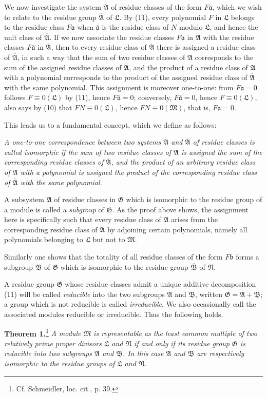 \documentclass[11pt]{article}
\newcommand{\mM}{\mathfrak{M}}
\newcommand{\mN}{\mathfrak{N}}
\newcommand{\mL}{\mathfrak{L}}
\newcommand{\mG}{\mathfrak{G}}
\newcommand{\mA}{\mathfrak{A}}
\newcommand{\mB}{\mathfrak{B}}
\newcommand{\ma}{\mathfrak{a}}
\newcommand{\mb}{\mathfrak{b}}
\newcommand{\mbarA}{\overline{\mathfrak{A}}}
\newcommand{\mbarB}{\overline{\mathfrak{B}}}
\newcommand{\bara}{\overline{\mathfrak{a}}}
\begin{document}
We now investigate the system $\mA$ of residue classes of the form $F\ma$, which we wish to relate to the residue group $\mbarA$ of $\mL$. By (11), every polynomial $F$ in $\mL$ belongs to the residue class $F\ma$ when $\bara$ is the residue class of $N$ modulo $\mL$, and hence the unit class of $\mbarA$. If we now associate the residue classes $F\ma$ in $\mA$ with the residue classes $F\bara$ in $\mbarA$, then to every residue class of $\mA$ there is assigned a residue class of $\mbarA$, in such a way that the sum of two residue classes of $\mA$ corresponds to the sum of the assigned residue classes of $\mbarA$, and the product of a residue class of $\mA$ with a polynomial corresponds to the product of the assigned residue class of $\mbarA$ with the same polynomial. This assignment is moreover one-to-one: from $F\ma=0$ follows $F\equiv0(\mL)$ by (11), hence $F\bara=0$; conversely, $F\bara=0$, hence $F\equiv0(\mL)$, also says by (10) that $FN\equiv0(\mL)$, hence $FN\equiv0(\mM)$, that is, $F\ma=0$.

This leads us to a fundamental concept, which we define as follows:

\emph{A one-to-one correspondence between two systems $\mA$ and $\mbarA$ of residue classes is called isomorphic if the sum of two residue classes of $\mA$ is assigned the sum of the corresponding residue classes of $\mbarA$, and the product of an arbitrary residue class of $\mA$ with a polynomial is assigned the product of the corresponding residue class of $\mbarA$ with the same polynomial.}

A subsystem $\mA$ of residue classes in $\mG$ which is isomorphic to the residue group of a module is called a \emph{subgroup} of $\mG$. As the proof above shows, the assignment here is specifically such that every residue class of $\mA$ arises from the corresponding residue class of $\mbarA$ by adjoining certain polynomials, namely all polynomials belonging to $\mL$ but not to $\mM$.

Similarly one shows that the totality of all residue classes of the form $F\mb$ forms a subgroup $\mB$ of $\mG$ which is isomorphic to the residue group $\mbarB$ of $\mN$.

A residue group $\mG$ whose residue classes admit a unique additive decomposition (11) will be called \emph{reducible} into the two subgroups $\mA$ and $\mB$, written $\mG=\mA+\mB$; a group which is not reducible is called \emph{irreducible}. We also occasionally call the associated modules reducible or irreducible. Thus the following holds.

\textbf{Theorem 1.}\footnote{Cf. Schmeidler, loc. cit., p. 39.} \emph{A module $\mM$ is representable as the least common multiple of two relatively prime proper divisors $\mL$ and $\mN$ if and only if its residue group $\mG$ is reducible into two subgroups $\mA$ and $\mB$. In this case $\mA$ and $\mB$ are respectively isomorphic to the residue groups of $\mL$ and $\mN$.}
\end{document}
